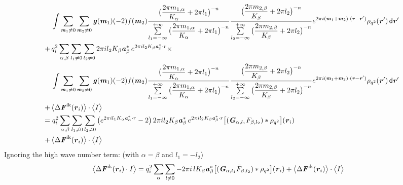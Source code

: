 \documentclass[aps,pre,preprint]{revtex4}
\renewcommand{\v}[1]{\textbf{\textit{#1}}}
\renewcommand{\d}[1]{\textsf{#1}}
\begin{document}
\begin{align}
  &\,
  \int
  \sum_{\v m_1\neq 0}\sum_{\v m_2\neq 0}
  \v g(\v m_1) (-2) f(\v m_2)
  \frac
  {\big(\dfrac{2\pi m_{1,\alpha}}{K_\alpha} + 2\pi l_1\big)^{-n}}
  {\sum\limits_{l_1=-\infty}^{+\infty}
    \big(\dfrac{2\pi m_{1,\alpha}}{K_\alpha} + 2\pi l_1\big)^{-n}}
  \frac
  {\big(\dfrac{2\pi m_{2,\beta}}{K_\beta} + 2\pi l_2\big)^{-n}}
  {\sum\limits_{l_2=-\infty}^{+\infty}
    \big(\dfrac{2\pi m_{2,\beta}}{K_\beta} + 2\pi l_2\big)^{-n}}
  e^{2\pi i(\v m_1+\v m_2)\cdot(\v r - \v r')} \rho_{q^2}(\v r') \,\d d\v r' \\\nonumber
  +&\,
  q^2_i
  \sum_{\alpha, \beta}\sum_{l_1\neq 0}\sum_{l_2\neq 0}
  2\pi i l_2K_\beta \v a_\beta ^\ast\,e^{2\pi i l_2 K_\beta \v a_\beta^\ast\cdot r} \times \\\nonumber
  &\,
  \int
  \sum_{\v m_1\neq 0}\sum_{\v m_2\neq 0}
  \v g(\v m_1) (-2) f(\v m_2)
  \frac
  {\big(\dfrac{2\pi m_{1,\alpha}}{K_\alpha} + 2\pi l_1\big)^{-n}}
  {\sum\limits_{l_1=-\infty}^{+\infty}
    \big(\dfrac{2\pi m_{1,\alpha}}{K_\alpha} + 2\pi l_1\big)^{-n}}
  \frac
  {\big(\dfrac{2\pi m_{2,\beta}}{K_\beta} + 2\pi l_2\big)^{-n}}
  {\sum\limits_{l_2=-\infty}^{+\infty}
    \big(\dfrac{2\pi m_{2,\beta}}{K_\beta} + 2\pi l_2\big)^{-n}}
  e^{2\pi i(\v m_1+\v m_2)\cdot(\v r - \v r')} \rho_{q^2}(\v r') \,\d d\v r' \\ \nonumber
  + &\,
  \big\langle
  \Delta\v F^{\textrm{ik}}(\v r_i)
  \big\rangle
  \cdot 
  \big\langle
  I
  \big\rangle   \\\nonumber
  =&\;
  q^2_i
  \sum_{\alpha, \beta}\sum_{l_1\neq 0}\sum_{l_2\neq 0}
  \big(
  e^{2\pi i l_1 K_\alpha\v a_\alpha^\ast\cdot r} - 2
  \big)\,
  2\pi i l_2K_\beta \v a_\beta ^\ast
  \,e^{2\pi i l_2 K_\beta \v a_\beta^\ast\cdot r}
  \big[
  (\v G_{\alpha,l_1} F_{\beta,l_2}) \ast \rho_{q^2}
  \big] (\v r_i) \\
  + &\,
  \big\langle
  \Delta\v F^{\textrm{ik}}(\v r_i)
  \big\rangle
  \cdot 
  \big\langle
  I
  \big\rangle   
\end{align}
Ignoring the high wave number term: (with $\alpha = \beta$ and $l_1 = -l_2$)
\begin{align}
  \big\langle
  \Delta\v F^{\textrm{ik}}(\v r_i)\cdot I
  \big\rangle
    =&\;
  q^2_i
  \sum_{\alpha}\sum_{l\neq 0}
  -2\pi i\,l K_\beta \v a_\beta ^\ast
  \big[
  (\v G_{\alpha,l_1} \bar F_{\beta,l_2}) \ast \rho_{q^2}
  \big] (\v r_i) +
  \big\langle
  \Delta\v F^{\textrm{ik}}(\v r_i)
  \big\rangle
  \cdot 
  \big\langle
  I
  \big\rangle   
\end{align}
\end{document}
